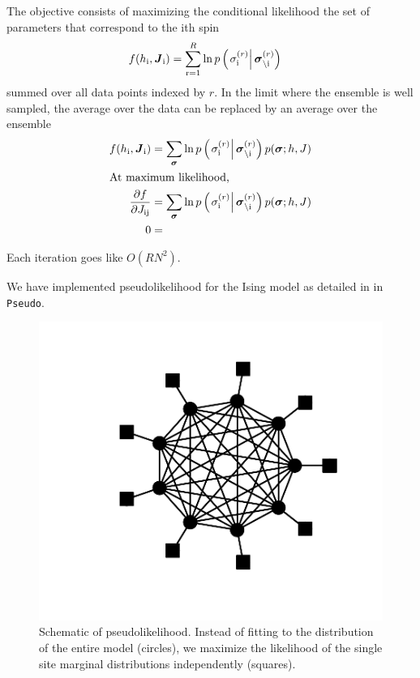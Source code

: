 \documentclass[aps,prl,twocolumn]{revtex4-1}
\begin{document}
The objective consists of maximizing the conditional likelihood the set of parameters that correspond to the ith spin
\begin{align}
	f(h_{\rm i},\boldsymbol{J}_{\rm i}) &= \sum_{\rm r=1}^R \ln p\left(\left.\sigma_{\rm i}^{(r)}\right|\boldsymbol{\sigma}_{\backslash\rm i}^{(r)}\right)
\end{align}
summed over all data points indexed by $r$.
In the limit where the ensemble is well sampled, the average over the data can be replaced by an average over the ensemble
\begin{align}
	f(h_{\rm i},\boldsymbol{J}_{\rm i}) &= \sum_{\boldsymbol{\sigma}} \ln p\left(\left.\sigma_{\rm i}^{(r)}\right|\boldsymbol{\sigma}_{\backslash\rm i}^{(r)}\right)p(\boldsymbol{\sigma};h,J)\\
\intertext{At maximum likelihood,}
	\frac{\partial f}{\partial J_{\rm ij}} &= \sum_{\boldsymbol{\sigma}} \ln p\left(\left.\sigma_{\rm i}^{(r)}\right|\boldsymbol{\sigma}_{\backslash\rm i}^{(r)}\right)p(\boldsymbol{\sigma};h,J)\\
	0 &=
\end{align}

Each iteration goes like $O(RN^2)$.

We have implemented pseudolikelihood for the Ising model as detailed in \cite{Aurell:2012hi} in {\tt Pseudo}.

\begin{figure}[htbp]\centering
	\includegraphics[width=.85\linewidth,clip,trim={100 50 30 30}]{images/pseudo}
\caption{Schematic of pseudolikelihood. Instead of fitting to the distribution of the entire model (circles), we maximize the likelihood of the single site marginal distributions independently (squares).}
\label{gr:pseudo}
\end{figure}
\end{document}
